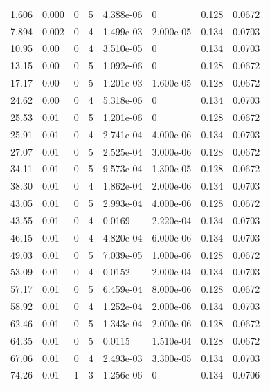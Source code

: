 \documentclass[preview]{standalone}
\begin{document}
{{\begin{tabular}{L{1.2cm}C{1.2cm} C{0.3cm}C{0.5cm} C{1.4cm}C{1.4cm} C{1.4cm}C{1.4cm}}
  1.606  &  0.000  & 0     &  5 &  4.388e-06  & 0  & 0.128 &  0.0672   \\ 
  7.894  &  0.002  & 0     &  4 &  1.499e-03  & 2.000e-05  & 0.134 &  0.0703   \\ 
  10.95  &  0.00  & 0     &  4 &  3.510e-05  & 0  & 0.134 &  0.0703   \\ 
  13.15  &  0.00  & 0     &  5 &  1.092e-06  & 0  & 0.128 &  0.0672   \\ 
  17.17  &  0.00  & 0     &  5 &  1.201e-03  & 1.600e-05  & 0.128 &  0.0672   \\ 
  24.62  &  0.00  & 0     &  4 &  5.318e-06  & 0  & 0.134 &  0.0703   \\ 
  25.53  &  0.01  & 0     &  5 &  1.201e-06  & 0  & 0.128 &  0.0672   \\ 
  25.91  &  0.01  & 0     &  4 &  2.741e-04  & 4.000e-06  & 0.134 &  0.0703   \\ 
  27.07  &  0.01  & 0     &  5 &  2.525e-04  & 3.000e-06  & 0.128 &  0.0672   \\ 
  34.11  &  0.01  & 0     &  5 &  9.573e-04  & 1.300e-05  & 0.128 &  0.0672   \\ 
  38.30  &  0.01  & 0     &  4 &  1.862e-04  & 2.000e-06  & 0.134 &  0.0703   \\ 
  43.05  &  0.01  & 0     &  5 &  2.993e-04  & 4.000e-06  & 0.128 &  0.0672   \\ 
  43.55  &  0.01  & 0     &  4 &  0.0169  & 2.220e-04  & 0.134 &  0.0703   \\ 
  46.15  &  0.01  & 0     &  4 &  4.820e-04  & 6.000e-06  & 0.134 &  0.0703   \\ 
  49.03  &  0.01  & 0     &  5 &  7.039e-05  & 1.000e-06  & 0.128 &  0.0672   \\ 
  53.09  &  0.01  & 0     &  4 &  0.0152  & 2.000e-04  & 0.134 &  0.0703   \\ 
  57.17  &  0.01  & 0     &  5 &  6.459e-04  & 8.000e-06  & 0.128 &  0.0672   \\ 
  58.92  &  0.01  & 0     &  4 &  1.252e-04  & 2.000e-06  & 0.134 &  0.0703   \\ 
  62.46  &  0.01  & 0     &  5 &  1.343e-04  & 2.000e-06  & 0.128 &  0.0672   \\ 
  64.35  &  0.01  & 0     &  5 &  0.0115  & 1.510e-04  & 0.128 &  0.0672   \\ 
  67.06  &  0.01  & 0     &  4 &  2.493e-03  & 3.300e-05  & 0.134 &  0.0703   \\ 
  74.26  &  0.01  & 1     &  3 &  1.256e-06  & 0  & 0.134 &  0.0706   \\ 

\end{tabular}}}
\end{document}
